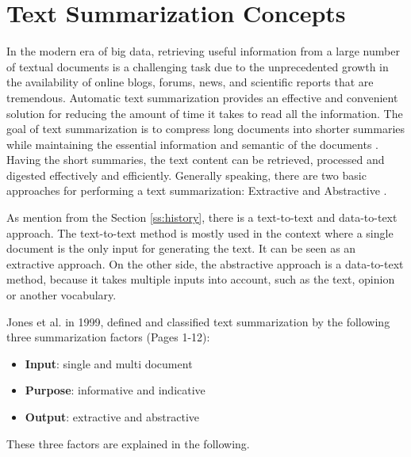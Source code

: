 \section{Text Summarization Concepts}

In the modern era of big data, retrieving useful information from a large number of textual documents is a challenging task due to the unprecedented growth in the availability of online blogs, forums, news, and scientific reports that are tremendous. Automatic text summarization provides an effective and convenient solution for reducing the amount of time it takes to read all the information. The goal of text summarization is to compress long documents into shorter summaries while maintaining the essential information and semantic of the documents \cite{ts-intro} \cite{ts-intro2}. Having the short summaries, the text content can be retrieved, processed and digested effectively and efficiently. 
Generally speaking, there are two basic approaches for performing a text summarization: Extractive and Abstractive \cite{ts-intro3}. 

As mention from the Section \ref{ss:history}, there is a text-to-text and data-to-text approach. The text-to-text method is mostly used in the context where a single document is the only input for generating the text. It can be seen as an extractive approach.  On the other side, the abstractive approach is a data-to-text method, because it takes multiple inputs into account, such as the text, opinion or another vocabulary.

Jones et al. in 1999, defined and classified text summarization by the following three summarization factors \cite{Jones98automaticsummarising:} (Pages 1-12):

\begin{itemize}
	\item \textbf{Input}: single and multi document
	\item \textbf{Purpose}: informative and indicative
	\item \textbf{Output}: extractive and abstractive
\end{itemize}

These three factors are explained in the following.


